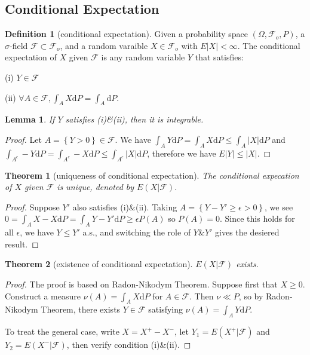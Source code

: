 \documentclass{article}
\newtheorem{Thm}{Theorem}[section]
\newtheorem{Lem}{Lemma}[section]
\theoremstyle{definition}
\newtheorem{Def}{Definition}[section]
\begin{document}
\subsection{Conditional Expectation}
\begin{Def}[conditional expectation]
Given a probability space $(\Omega,\mathcal{F}_o,P)$, a $\sigma$-field $\mathcal{F}\subset\mathcal{F}_o$, and a random varaible $X\in\mathcal{F}_o$ with $E\left|X\right|<\infty$. The conditional expectation of $X$ given $\mathcal{F}$ is any random variable $Y$ that satisfies:\par
(i) $Y\in\mathcal{F}$\par
(ii) $\forall A\in\mathcal{F},\int_AX\mathrm{d}P=\int_A\mathrm{d}P$.
\end{Def}
\begin{Lem}
If $Y$ satisfies (i)\&(ii), then it is integrable.
\end{Lem}
\begin{proof}
Let $A=\left \{ Y>0 \right \} \in \mathcal{F}$. We have $\int_AY\mathrm{d}P=\int_AX\mathrm{d}P\le\int_A\left | X \right | \mathrm{d}P$ and $\int_{A^c}-Y\mathrm{d}P=\int_{A^c}-X\mathrm{d}P\le \int_{A^c}\left | X \right | \mathrm{d}P$, therefore we have $E\left |Y \right | \le\left | X \right | $.
\end{proof}
\begin{Thm}[uniqueness of conditional expectation]
The conditional expecation of $X$ given $\mathcal{F}$ is unique, denoted by $E(X|\mathcal{F})$.
\end{Thm}
\begin{proof}
Suppose $Y'$ also satisfies (i)\&(ii). Taking $A=\left \{ Y-Y'\ge\epsilon>0 \right \} $, we see $0=\int_AX-X\mathrm{d}P=\int_AY-Y'\mathrm{d}P\ge\epsilon P(A)$ so $P(A)=0$. Since this holds for all $\epsilon$, we have $Y\le Y'$ a.s., and switching the role of $Y$\&$Y'$ gives the desiered result.
\end{proof}
\begin{Thm}[existence of conditional expectation]
$E(X|\mathcal{F})$ exists.
\end{Thm}
\begin{proof}
The proof is based on Radon-Nikodym Theorem. Suppose first that $X\ge 0$. Construct  a measure $\nu(A)=\int_AX\mathrm{d}P$ for $A\in\mathcal{F}$. Then $\nu\ll P$, so by Radon-Nikodym Theorem, there exists $Y\in\mathcal{F}$ satisfying $\nu(A)=\int_AY\mathrm{d}P$.\par
To treat the general case, write $X=X^+-X^-$, let $Y_1=E(X^+|\mathcal{F})$ and $Y_2=E(X^-|\mathcal{F})$, then verify condition (i)\&(ii).
\end{proof}
\end{document}
